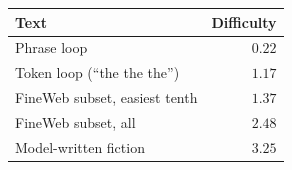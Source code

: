 \begin{tabular}{lr}
  \toprule
  Text & Difficulty \\
  \midrule
  Phrase loop                              & $0.22$ \\  %
  Token loop (``the the the'')             & $1.17$ \\  %
  FineWeb subset, easiest tenth            & $1.37$ \\  %
  FineWeb subset, all                      & $2.48$ \\  %
  Model-written fiction                    & $3.25$ \\  %
  \bottomrule
\end{tabular}
